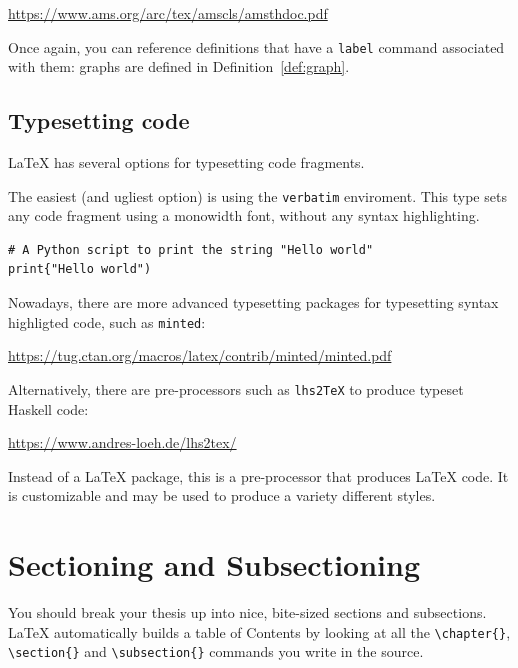 \url{https://www.ams.org/arc/tex/amscls/amsthdoc.pdf}

Once again, you can reference definitions that have a \texttt{label}
command associated with them: graphs are defined in Definition~\ref{def:graph}.

\subsection{Typesetting code}
\label{sec:code}

LaTeX has several options for typesetting code fragments.

The easiest (and ugliest option) is using the \texttt{verbatim}
enviroment. This type sets any code fragment using a monowidth font,
without any syntax highlighting.

\begin{verbatim}
# A Python script to print the string "Hello world"
print{"Hello world")
\end{verbatim}

Nowadays, there are more advanced typesetting packages for typesetting
syntax highligted code, such as \texttt{minted}:

\url{https://tug.ctan.org/macros/latex/contrib/minted/minted.pdf}

\noindent Alternatively, there are pre-processors such as \texttt{lhs2TeX} to
produce typeset Haskell code:

\url{https://www.andres-loeh.de/lhs2tex/}

\noindent Instead of a LaTeX package, this is a pre-processor that produces LaTeX
code. It is customizable and may be used to produce a variety different
styles.


\section{Sectioning and Subsectioning}
\label{sec:sec}

You should break your thesis up into nice, bite-sized sections and
subsections. \LaTeX{} automatically builds a table of Contents by
looking at all the \verb|\chapter{}|, \verb|\section{}| and
\verb|\subsection{}| commands you write in the source.

